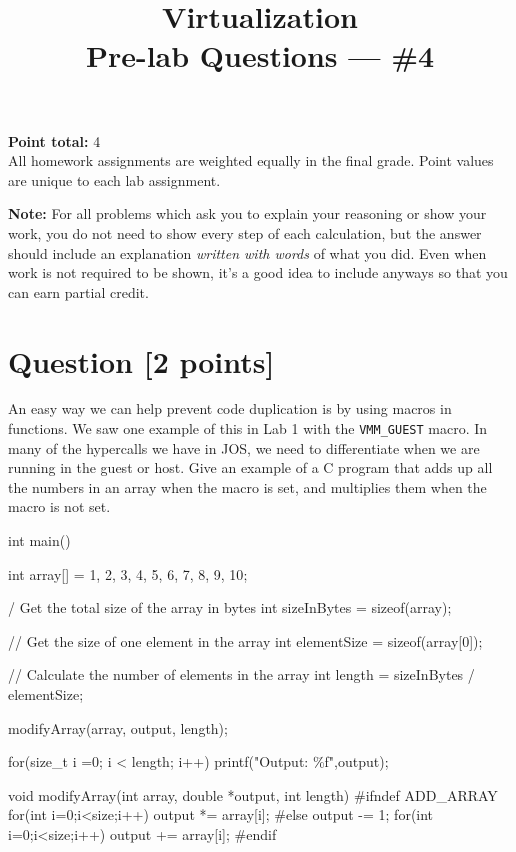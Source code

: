 \documentclass[11pt]{article}
\providecommand{\due}{}
\begin{document}
\title{Virtualization\\Pre-lab Questions --- \#4}
\date{\due}

\maketitle

\noindent \textbf{Point total:} 4
\\ All homework assignments are weighted equally in the final grade. Point values are unique to each lab assignment.

\textbf{Note:} For all problems which ask you to explain your reasoning or show your work, you do not need to show every step of each calculation, but the answer should include an explanation \emph{written with words} of what you did.  Even when work is not required to be shown, it’s a good idea to include anyways so that you can earn partial credit.

\section{Question [2 points]}

An easy way we can help prevent code duplication is by using macros in functions. We saw one example of this in Lab 1 with the \texttt{VMM\_GUEST} macro. In many of the hypercalls we have in JOS, we need to differentiate when we are running in the guest or host. Give an example of a C program that adds up all the numbers in an array when the macro is set, and multiplies them when the macro is not set.

\begin{solution}
int main()
{
    int array[] = {1, 2, 3, 4, 5, 6, 7, 8, 9, 10};

    / Get the total size of the array in bytes
    int sizeInBytes = sizeof(array);

    // Get the size of one element in the array
    int elementSize = sizeof(array[0]);

    // Calculate the number of elements in the array
    int length = sizeInBytes / elementSize;

    modifyArray(array, output, length);

    for(size_t i =0; i < length; i++)
    {
        printf("Output: \%f",output);
    }
}

void modifyArray(int array, double *output, int length)
{
#ifndef ADD_ARRAY 
    for(int i=0;i<size;i++)
    {
        output *= array[i];
    }
#else
    output -= 1;
    for(int i=0;i<size;i++)
    {
        output += array[i];
    }
#endif
}
\end{solution}
\end{document}
